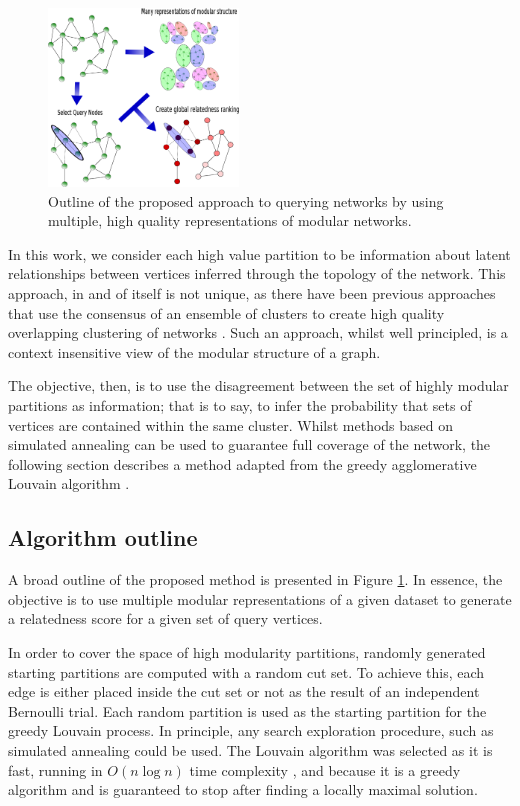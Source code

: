 \documentclass[sigconf]{acmart}
\begin{document}
\begin{figure}[t]
    \centering
    \includegraphics[width=0.45\textwidth]{images/meth_fig/fig1_desc.eps}
    \caption{Outline of the proposed approach to querying networks by using multiple, high quality representations of modular networks.}
    \label{fig:algorithm_outline}
\end{figure}

In this work, we consider each high value partition to be information about latent relationships between vertices inferred through the topology of the network.
This approach, in and of itself is not unique, as there have been previous approaches that use the consensus of an ensemble of clusters to create high quality overlapping clustering of networks \cite{lancichinetti2012consensus}.
Such an approach, whilst well principled, is a context insensitive view of the modular structure of a graph.

The objective, then, is to use the disagreement between the set of highly modular partitions as information; that is to say, to infer the probability that sets of vertices are contained within the same cluster.
Whilst methods based on simulated annealing can be used to guarantee full coverage of the network, the following section describes a method adapted from the greedy agglomerative Louvain algorithm \cite{blondel2008fast}.

\subsection{Algorithm outline}
A broad outline of the proposed method is presented in Figure \ref{fig:algorithm_outline}.
In essence, the objective is to use multiple modular representations of a given dataset to generate a relatedness score for a given set of query vertices.

In order to cover the space of high modularity partitions, randomly generated starting partitions are computed with a random cut set.
To achieve this, each edge is either placed inside the cut set or not as the result of an independent Bernoulli trial. 
Each random partition is used as the starting partition for the greedy Louvain process.
In principle, any search exploration procedure, such as simulated annealing \cite{good2010performance} could be used.
The Louvain algorithm was selected as it is fast, running in $O(n \log n)$ time complexity \cite{blondel2008fast}, and because it is a greedy algorithm and is guaranteed to stop after finding a locally maximal solution.
\end{document}
